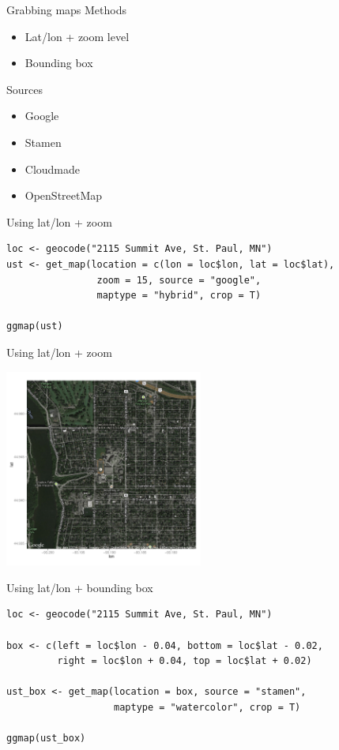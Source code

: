 \documentclass[sans,aspectratio=169,presentation,bigger,fleqn]{beamer}
\begin{document}
\begin{frame}[label=sec-3]{Grabbing maps}
Methods
\begin{itemize}
\item Lat/lon + zoom level
\item Bounding box
\end{itemize}

Sources
\begin{itemize}
\item Google
\item Stamen
\item Cloudmade
\item OpenStreetMap
\end{itemize}
\end{frame}
\begin{frame}[fragile,label=sec-4]{Using lat/lon + zoom}
 \begin{verbatim}
loc <- geocode("2115 Summit Ave, St. Paul, MN")
ust <- get_map(location = c(lon = loc$lon, lat = loc$lat),
                zoom = 15, source = "google",
                maptype = "hybrid", crop = T)

ggmap(ust)
\end{verbatim}
\end{frame}
\begin{frame}[label=sec-5]{Using lat/lon + zoom}
\begin{center}
\includegraphics[height=6.5cm]{./plots/ust-coords-zoom.pdf}
\end{center}
\end{frame}
\begin{frame}[fragile,label=sec-6]{Using lat/lon + bounding box}
 \begin{verbatim}
loc <- geocode("2115 Summit Ave, St. Paul, MN")

box <- c(left = loc$lon - 0.04, bottom = loc$lat - 0.02,
         right = loc$lon + 0.04, top = loc$lat + 0.02)

ust_box <- get_map(location = box, source = "stamen",
                   maptype = "watercolor", crop = T)

ggmap(ust_box)
\end{verbatim}
\end{frame}
\end{document}
